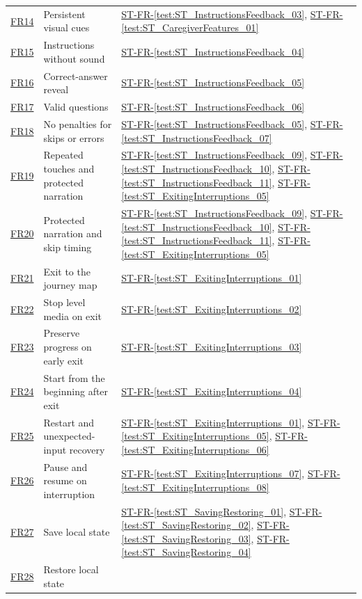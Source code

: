 \documentclass[10pt,titlepage]{article}
\newcommand{\frtestref}[1]{%
    \hyperref[test:#1]{ST-FR-\ref*{test:#1}}}
\newcommand{\srsurl}{https://team-hindsight.github.io/ophthamology-game/SRS/SRS.pdf}
\newcommand{\srsfrref}[2]{\href{\srsurl\#nameddest=#1}{FR#2}}
\begin{document}
\begin{longtable}{@{}>{\raggedright\arraybackslash}p{}
  >{\raggedright\arraybackslash}p{}
  >{\raggedright\arraybackslash}p{}@{}}
\srsfrref{FR_VisualCues}{14} & Persistent visual cues &
  \frtestref{ST_InstructionsFeedback_03}, \frtestref{ST_CaregiverFeatures_01}\\
\srsfrref{FR_NarrationFallback}{15} & Instructions without sound &
  \frtestref{ST_InstructionsFeedback_04}\\
\srsfrref{FR_RevealAnswer}{16} & Correct-answer reveal &
  \frtestref{ST_InstructionsFeedback_05}\\
\srsfrref{FR_ValidQuestions}{17} & Valid questions &
  \frtestref{ST_InstructionsFeedback_06}\\
\srsfrref{FR_NoPenalty}{18} & No penalties for skips or errors &
  \frtestref{ST_InstructionsFeedback_05}, \frtestref{ST_InstructionsFeedback_07}\\
\srsfrref{FR_IgnoreRepeatedTouches}{19} & Repeated touches and protected narration &
  \frtestref{ST_InstructionsFeedback_09}, \frtestref{ST_InstructionsFeedback_10}, \frtestref{ST_InstructionsFeedback_11}, \frtestref{ST_ExitingInterruptions_05}\\
\srsfrref{FR_HoldSkip}{20} & Protected narration and skip timing & 
  \frtestref{ST_InstructionsFeedback_09}, \frtestref{ST_InstructionsFeedback_10}, \frtestref{ST_InstructionsFeedback_11}, \frtestref{ST_ExitingInterruptions_05}\\
\srsfrref{FR_ExitLevel}{21} & Exit to the journey map &
  \frtestref{ST_ExitingInterruptions_01}\\
\srsfrref{FR_StopOnExit}{22} & Stop level media on exit &
  \frtestref{ST_ExitingInterruptions_02}\\
\srsfrref{FR_ExitKeepsData}{23} & Preserve progress on early exit &
  \frtestref{ST_ExitingInterruptions_03}\\
\srsfrref{FR_RestartAfterExit}{24} & Start from the beginning after exit &
  \frtestref{ST_ExitingInterruptions_04}\\
\srsfrref{FR_RestartLevel}{25} & Restart and unexpected-input recovery &
  \frtestref{ST_ExitingInterruptions_01}, \frtestref{ST_ExitingInterruptions_05}, \frtestref{ST_ExitingInterruptions_06}\\
\srsfrref{FR_Suspend}{26} & Pause and resume on interruption &
  \frtestref{ST_ExitingInterruptions_07}, \frtestref{ST_ExitingInterruptions_08}\\
\srsfrref{FR_PersistState}{27} & Save local state &
  \frtestref{ST_SavingRestoring_01}, \frtestref{ST_SavingRestoring_02}, \frtestref{ST_SavingRestoring_03}, \frtestref{ST_SavingRestoring_04}\\
\srsfrref{FR_RestoreState}{28} & Restore local state & 

\end{longtable}
\end{document}
